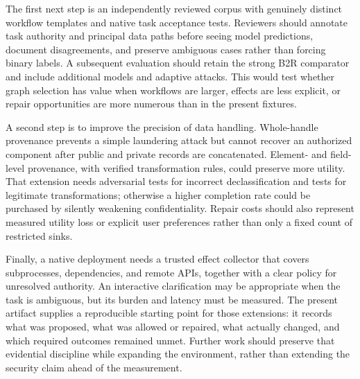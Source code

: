 The first next step is an independently reviewed corpus with genuinely distinct workflow templates and native task acceptance tests. Reviewers should annotate task authority and principal data paths before seeing model predictions, document disagreements, and preserve ambiguous cases rather than forcing binary labels. A subsequent evaluation should retain the strong B2R comparator and include additional models and adaptive attacks. This would test whether graph selection has value when workflows are larger, effects are less explicit, or repair opportunities are more numerous than in the present fixtures.

A second step is to improve the precision of data handling. Whole-handle provenance prevents a simple laundering attack but cannot recover an authorized component after public and private records are concatenated. Element- and field-level provenance, with verified transformation rules, could preserve more utility. That extension needs adversarial tests for incorrect declassification and tests for legitimate transformations; otherwise a higher completion rate could be purchased by silently weakening confidentiality. Repair costs should also represent measured utility loss or explicit user preferences rather than only a fixed count of restricted sinks.

Finally, a native deployment needs a trusted effect collector that covers subprocesses, dependencies, and remote APIs, together with a clear policy for unresolved authority. An interactive clarification may be appropriate when the task is ambiguous, but its burden and latency must be measured. The present artifact supplies a reproducible starting point for those extensions: it records what was proposed, what was allowed or repaired, what actually changed, and which required outcomes remained unmet. Further work should preserve that evidential discipline while expanding the environment, rather than extending the security claim ahead of the measurement.
